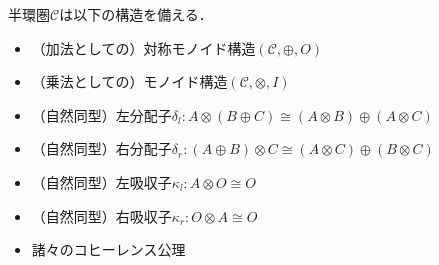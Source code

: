\documentclass[type_judgement.tex]{subfiles}
\begin{document}


\begin{defn}
半環圏$\mathcal{C}$は以下の構造を備える．
\begin{itemize}
    \item （加法としての）対称モノイド構造$(\mathcal{C},\oplus,O)$
    \item （乗法としての）モノイド構造$(\mathcal{C},\otimes,I)$
    \item （自然同型）左分配子$\delta_l:A \otimes (B \oplus C) \cong (A \otimes B) \oplus (A \otimes C)$
    \item （自然同型）右分配子$\delta_r:(A \oplus B) \otimes C \cong (A \otimes C) \oplus (B \otimes C)$
    \item （自然同型）左吸収子$\kappa_l:A \otimes O \cong O$
    \item （自然同型）右吸収子$\kappa_r:O \otimes A \cong O$
    \item 諸々のコヒーレンス公理\cite{laplaza72}
\end{itemize}
\end{defn}

\begin{defn}
\end{defn}

\begin{defn}

\end{defn}

\begin{defn}

\end{defn}

\begin{defn}

\end{defn}
\end{document}

